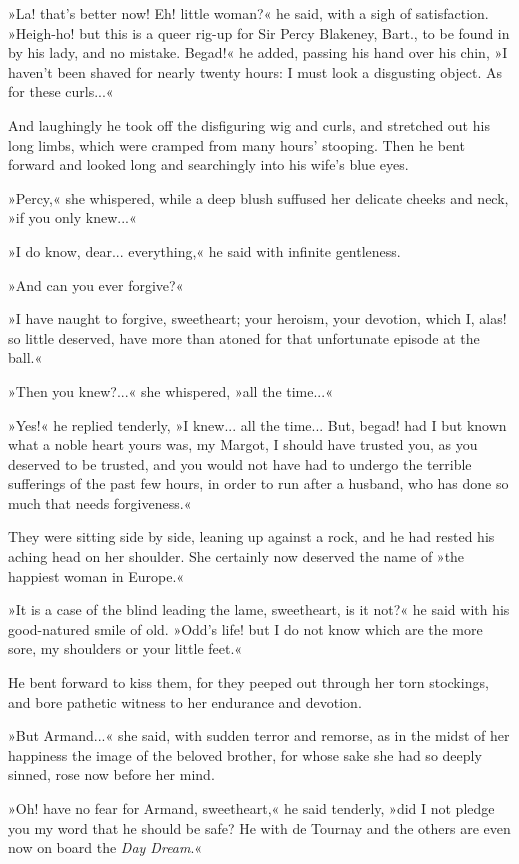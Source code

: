 »La! that's better now! Eh! little woman?« he said, with a sigh of satisfaction. »Heigh-ho! but this is a queer rig-up for Sir Percy Blakeney, Bart., to be found in by his lady, and no mistake. Begad!« he added, passing his hand over his chin, »I haven't been shaved for nearly twenty hours: I must look a disgusting object. As for these curls...«

And laughingly he took off the disfiguring wig and curls, and stretched out his long limbs, which were cramped from many hours' stooping. Then he bent forward and looked long and searchingly into his wife's blue eyes.

»Percy,« she whispered, while a deep blush suffused her delicate cheeks and neck, »if you only knew...«

»I do know, dear... everything,« he said with infinite gentleness.

»And can you ever forgive?«

»I have naught to forgive, sweetheart; your heroism, your devotion, which I, alas! so little deserved, have more than atoned for that unfortunate episode at the ball.«

»Then you knew?...« she whispered, »all the time...«

»Yes!« he replied tenderly, »I knew... all the time... But, begad! had I but known what a noble heart yours was, my Margot, I should have trusted you, as you deserved to be trusted, and you would not have had to undergo the terrible sufferings of the past few hours, in order to run after a husband, who has done so much that needs forgiveness.«

They were sitting side by side, leaning up against a rock, and he had rested his aching head on her shoulder. She certainly now deserved the name of »the happiest woman in Europe.«

»It is a case of the blind leading the lame, sweetheart, is it not?« he said with his good-natured smile of old. »Odd's life! but I do not know which are the more sore, my shoulders or your little feet.«

He bent forward to kiss them, for they peeped out through her torn stockings, and bore pathetic witness to her endurance and devotion.

»But Armand...« she said, with sudden terror and remorse, as in the midst of her happiness the image of the beloved brother, for whose sake she had so deeply sinned, rose now before her mind.

»Oh! have no fear for Armand, sweetheart,« he said tenderly, »did I not pledge you my word that he should be safe? He with de Tournay and the others are even now on board the \textit{Day Dream}.«

